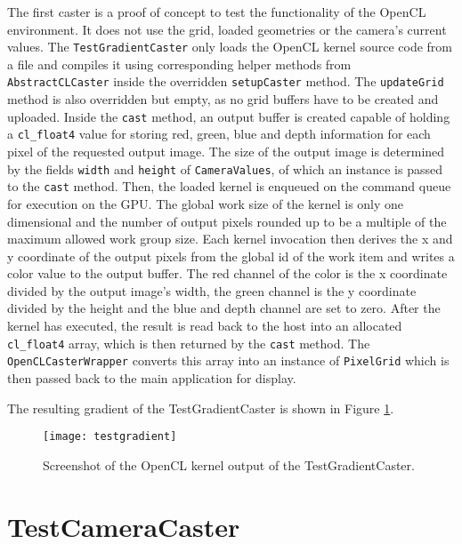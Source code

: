 The first caster is a proof of concept to test the functionality of the OpenCL environment. It does not use the grid, loaded geometries or the camera's current values. The \lstinline!TestGradientCaster! only loads the OpenCL kernel source code from a file and compiles it using corresponding helper methods from \lstinline!AbstractCLCaster! inside the overridden \lstinline!setupCaster! method. The \lstinline!updateGrid! method is also overridden but empty, as no grid buffers have to be created and uploaded. Inside the \lstinline!cast! method, an output buffer is created capable of holding a \lstinline!cl_float4! value for storing red, green, blue and depth information for each pixel of the requested output image. The size of the output image is determined by the fields \lstinline!width! and \lstinline!height! of \lstinline!CameraValues!, of which an instance is passed to the \lstinline!cast! method. Then, the loaded kernel is enqueued on the command queue for execution on the GPU. The global work size of the kernel is only one dimensional and the number of output pixels rounded up to be a multiple of the maximum allowed work group size. Each kernel invocation then derives the x and y coordinate of the output pixels from the global id of the work item and writes a color value to the output buffer. The red channel of the color is the x coordinate divided by the output image's width, the green channel is the y coordinate divided by the height and the blue and depth channel are set to zero. After the kernel has executed, the result is read back to the host into an allocated \lstinline!cl_float4! array, which is then returned by the \lstinline!cast! method. The \lstinline!OpenCLCasterWrapper! converts this array into an instance of \lstinline!PixelGrid! which is then passed back to the main application for display.

The resulting gradient of the TestGradientCaster is shown in Figure \ref{fig:testgradient}.

\begin{figure}[h]
\centering
\texttt{[image: testgradient]}
\caption{Screenshot of the OpenCL kernel output of the TestGradientCaster.}
\label{fig:testgradient}
\end{figure}


\section{TestCameraCaster}

